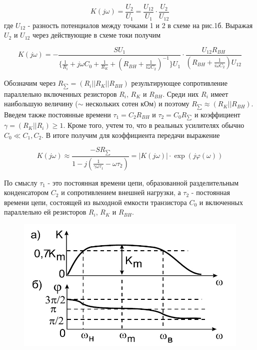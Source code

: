 $$K(j\omega)=\frac{U_2}{U_1}=\frac{U_{12}}{U_1} \cdot \frac{U_2}{U_{12}}$$
где $U_{12}$ - разность потенциалов между точками 1 и 2 в схеме на рис.1б. Выражая $U_2$ и $U_{12}$ через действующие в схеме токи получим

$$K(j\omega)=-\frac{SU_1}{\{\frac{1}{R_i}+j\omega C_0+\frac{1}{R_K}+(R_{BH}+\frac{1}{i\omega C_2})^{-1}\}U_1} \cdot \frac{U_{12}R_{BH}}{(R_{BH}+\frac{1}{i\omega C_2})U_{12}}$$

Обозначим через $R_{\sum}=(R_i||R_K||R_{BH})$ результирующее сопротивление параллельно включенных резисторов $R_i$, $R_K$ и $R_{BH}$. Среди них $R_i$ имеет наибольшую величину ($\sim$ нескольких сотен кОм) и поэтому $R_{\sum} \approx (R_K||R_{BH})$. Введем также постоянные времени $\tau_1=C_2 R_{BH}$ и $\tau_2=C_0 R_{\sum}$ и коэффициент $\gamma=(R_K||R_i)\geq 1$. Кроме того, учтем то, что в реальных усилителях обычно $C_0 \ll C_1,C_2$. В итоге получим для коэффициента передачи выражение

\begin{equation}
	K(j\omega) \approx \frac{-SR_{\sum}}{1-j(\frac{1}{\gamma \omega \tau_1}-\omega \tau_2)}=|K(j \omega)| 
	\cdot \exp(j \varphi(\omega))
	\label{eq:3}
\end{equation}

По смыслу $\tau_1$ - это постоянная времени цепи, образованной разделительным конденсатором $C_2$ и сопротивлением внешней нагрузки, а $\tau_2$ - постоянная времени цепи, состоящей из выходной емкости транзистора $C_0$ и включенных параллельно ей  резисторов $R_i$, $R_K$ и $R_{BH}$.

\begin{figure}[h]
	\centering
	\includegraphics[width=0.6\linewidth]{fig/fig5}
	\caption{}
	\label{fig:5}
\end{figure}

